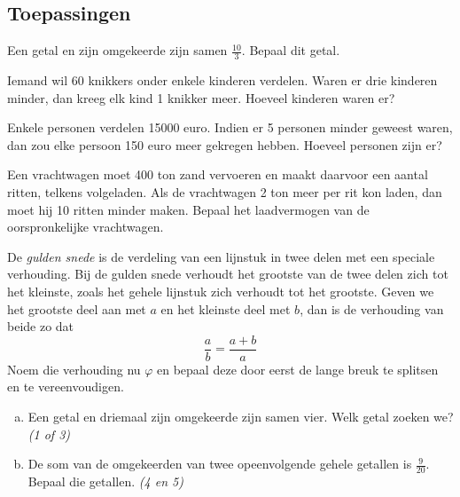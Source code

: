 \documentclass[12pt,twoside,a4paper]{article}
\begin{document}
\subsection{Toepassingen}

\begin{oefening}
Een getal en zijn omgekeerde zijn samen $\frac{10}{3}$. Bepaal dit getal.
\end{oefening}

\begin{oefening}
Iemand wil 60 knikkers onder enkele kinderen verdelen. Waren er drie kinderen minder, dan kreeg elk kind 1 knikker meer. Hoeveel kinderen waren er?
\end{oefening}

\begin{oefening}
Enkele personen verdelen 15000 euro. Indien er 5 personen minder geweest waren, dan zou elke persoon 150 euro meer gekregen hebben. Hoeveel personen zijn er?
\end{oefening}

\begin{oefening}
Een vrachtwagen moet 400 ton zand vervoeren en maakt daarvoor een aantal ritten, telkens volgeladen. Als de vrachtwagen 2 ton meer per rit kon laden, dan moet hij 10 ritten minder maken. Bepaal het laadvermogen van de oorspronkelijke vrachtwagen.
\end{oefening}

\begin{oefening}
  De {\em gulden snede} is de verdeling van een lijnstuk in twee delen met een speciale verhouding. Bij de gulden snede verhoudt het grootste van de twee delen zich tot het kleinste, zoals het gehele lijnstuk zich verhoudt tot het grootste. Geven we het grootste deel aan met $a$ en het kleinste deel met $b$, dan is de verhouding van beide zo dat $$\dfrac{a}{b}=\dfrac{a+b}{a}$$
  Noem die verhouding nu $\varphi$ en bepaal deze door eerst de lange breuk te splitsen en te vereenvoudigen.
\end{oefening}

\begin{oefening}
  \begin{enumerate}[(a)]
  \item Een getal en driemaal zijn omgekeerde zijn samen vier. Welk getal zoeken we? \hfill {\em (1 of 3)}
  \item De som van de omgekeerden van twee opeenvolgende gehele getallen is $\frac{9}{20}$. Bepaal die getallen. \hfill {\em (4 en 5)}
  \end{enumerate}
\end{oefening}
\end{document}

